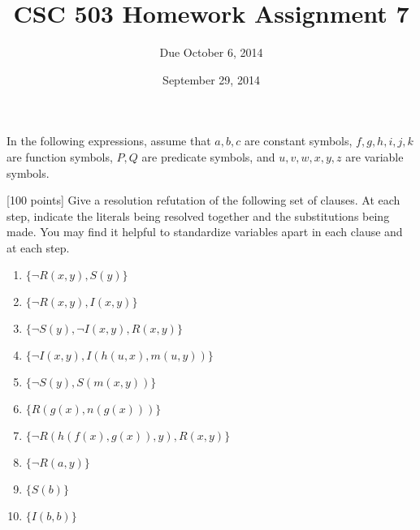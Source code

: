 \documentclass{article}
\title{CSC 503 Homework Assignment 7}
\author{Due October 6, 2014}
\date{September 29, 2014}
\begin{document}
\maketitle

\noindent
In the following expressions, assume that $a,b,c$ are constant
symbols, $f,g,h,i,j,k$ are function symbols, $P,Q$ are predicate symbols,
and $u,v,w,x,y,z$ are variable symbols.

\vspace*{1pc}

\noindent
{[100 points]} Give a resolution refutation of the following set of
clauses.  At each step, indicate the literals being resolved together
and the substitutions being made.  You may find it helpful to
standardize variables apart in each clause and at each step.
  \begin{enumerate}
  \item $\{ \neg R(x,y), S(y) \}$
  \item $\{ \neg R(x,y), I(x,y) \}$
  \item $\{ \neg S(y), \neg I(x,y), R(x,y) \}$
  \item $\{ \neg I(x,y), I(h(u,x),m(u,y)) \}$
  \item $\{ \neg S(y),  S(m(x,y)) \}$
  \item $\{ R(g(x),n(g(x))) \}$
  \item $\{ \neg R(h(f(x),g(x)),y), R(x,y) \}$
  \item $\{ \neg R(a,y) \}$
  \item $\{ S(b) \}$
  \item $\{ I(b,b) \}$
  \end{enumerate}
\end{document}
